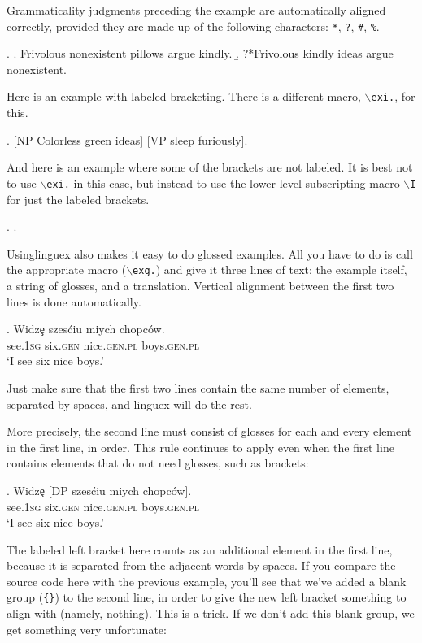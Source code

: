 \documentclass[letterpaper,12pt, twoside]{article}
\begin{document}
Grammaticality judgments preceding the example are automatically aligned correctly, provided they are made up of the following characters: \texttt{*}, \texttt{?}, \texttt{\#}, \texttt{\%}.

\ex. 
\a. Frivolous nonexistent pillows argue kindly.
\b. ?*Frivolous  kindly ideas argue nonexistent.


Here is an example with labeled bracketing. There is a different macro, \texttt{$\backslash$exi.}, for this.

\exi. [NP Colorless green ideas] [VP sleep furiously].

And here is an example where some of the brackets are not labeled. It is best not to use \texttt{$\backslash$exi.} in this case, but instead to use the lower-level subscripting macro \texttt{$\backslash$I} for just the labeled brackets.

\ex. . 


Using{linguex} also makes it easy to do glossed examples. All you have to do is call the appropriate macro (\texttt{$\backslash$exg.}) and give it three lines of text: the example itself, a string of glosses, and a translation. Vertical alignment between the first two lines is done automatically. 


\exg. Widz\c{e}  szes\'ciu {mi\textltilde ych} {ch\textltilde opc\'ow}. \\ 
see.\textsc{1sg} six.\textsc{gen} nice.\textsc{gen.pl} boys.\textsc{gen.pl} \\ 
 `I see six nice boys.'

Just make sure that the first two lines contain the same number of elements, separated by spaces, and {linguex} will do the rest. 

More precisely, the second line must consist of glosses for each and every element in the first line, in order. This rule continues to apply even when the first line contains elements that do not need glosses, such as brackets:

\exig. Widz\c{e}  [DP szes\'ciu {mi\textltilde ych} {ch\textltilde opc\'ow}]. \\ 
see.\textsc{1sg} {} six.\textsc{gen} nice.\textsc{gen.pl} boys.\textsc{gen.pl} \\ 
 `I see six nice boys.' 

The labeled left bracket here counts as an additional element in the first line, because it is separated from the adjacent words by spaces. If you compare the source code here with the previous example, you'll see that we've added a blank group (\verb|{}|) to the second line, in order to give the new left bracket something to align with (namely, nothing). This is a trick. If we don't add this blank group, we get something very unfortunate:
\end{document}
